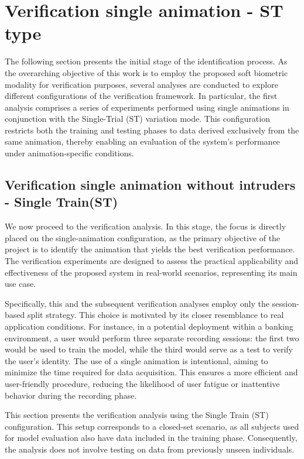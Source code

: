 \documentclass[12pt]{report}
\begin{document}
\section{Verification single animation - ST type}
\label{subsec:prima_ver}

The following section presents the initial stage of the identification process.
As the overarching objective of this work is to employ the proposed soft biometric modality for verification purposes, several analyses are conducted to explore different configurations of the verification framework.
In particular, the first analysis comprises a series of experiments performed using single animations in conjunction with the Single-Trial (ST) variation mode.
This configuration restricts both the training and testing phases to data derived exclusively from the same animation, thereby enabling an evaluation of the system's performance under animation-specific conditions.

\subsection{Verification single animation without intruders - Single Train(ST)}
\label{subsec:vs_st}

We now proceed to the verification analysis.
In this stage, the focus is directly placed on the single-animation configuration, as the primary objective of the project is to identify the animation that yields the best verification performance.
The verification experiments are designed to assess the practical applicability and effectiveness of the proposed system in real-world scenarios, representing its main use case.

Specifically, this and the subsequent verification analyses employ only the session-based split strategy.
This choice is motivated by its closer resemblance to real application conditions.
For instance, in a potential deployment within a banking environment, a user would perform three separate recording sessions: the first two would be used to train the model, while the third would serve as a test to verify the user's identity.
The use of a single animation is intentional, aiming to minimize the time required for data acquisition.
This ensures a more efficient and user-friendly procedure, reducing the likelihood of user fatigue or inattentive behavior during the recording phase.

This section presents the verification analysis using the Single Train (ST) configuration.
This setup corresponds to a closed-set scenario, as all subjects used for model evaluation also have data included in the training phase.
Consequently, the analysis does not involve testing on data from previously unseen individuals.
\end{document}
